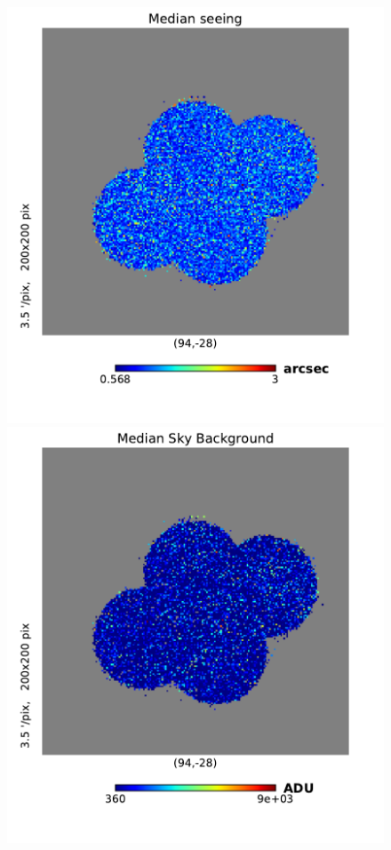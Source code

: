\documentclass[\docopts]{\docclass}
\begin{document}
\begin{figure}
\centering
\includegraphics[width=0.9\columnwidth]{median_seeing_2048.pdf}
\includegraphics[width=0.9\columnwidth]{median_skybg_2048.pdf}

\end{figure}
\end{document}
